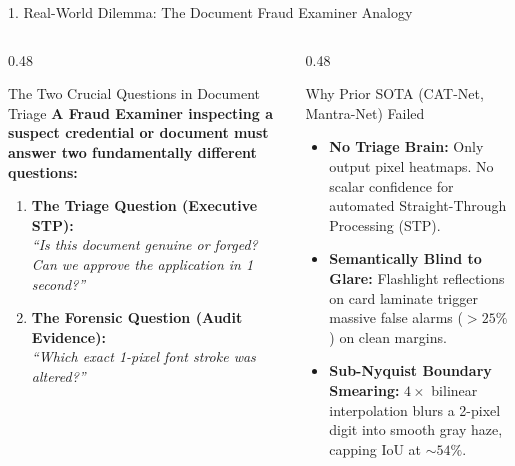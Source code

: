 \documentclass[aspectratio=169, 10pt]{beamer}
\begin{document}
\begin{frame}{1. Real-World Dilemma: The Document Fraud Examiner Analogy}
  \begin{columns}[T]
    \begin{column}{0.48\textwidth}
      \begin{alertbox}{The Two Crucial Questions in Document Triage}
        \textbf{A Fraud Examiner inspecting a suspect credential or document must answer two fundamentally different questions:}
        \begin{enumerate}\small
          \item \textbf{The Triage Question (Executive STP):}\\
          \textit{``Is this document genuine or forged? Can we approve the application in 1 second?''}
          \item \textbf{The Forensic Question (Audit Evidence):}\\
          \textit{``Which exact 1-pixel font stroke was altered?''}
        \end{enumerate}
      \end{alertbox}
    \end{column}
    
    \begin{column}{0.48\textwidth}
      \begin{crispbox}{Why Prior SOTA (CAT-Net, Mantra-Net) Failed}
        \begin{itemize}\small
          \item \textbf{No Triage Brain:} Only output pixel heatmaps. No scalar confidence for automated Straight-Through Processing (STP).
          \item \textbf{Semantically Blind to Glare:} Flashlight reflections on card laminate trigger massive false alarms ($>25\%$) on clean margins.
          \item \textbf{Sub-Nyquist Boundary Smearing:} $4\times$ bilinear interpolation blurs a 2-pixel digit into smooth gray haze, capping IoU at $\sim 54\%$.
        \end{itemize}
      \end{crispbox}
    \end{column}
  \end{columns}
\end{frame}
\end{document}
